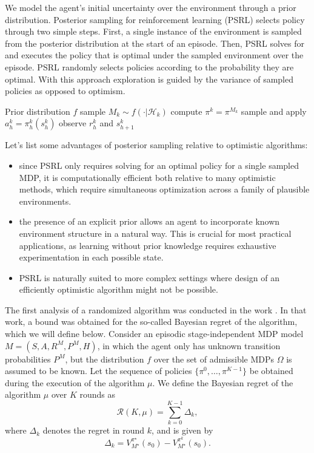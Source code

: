 \documentclass{article}
\numberwithin{equation}{section}
\newcommand{\cH}{\mathcal{H}}
\begin{document}
We model the agent's initial uncertainty over the environment
through a prior distribution. Posterior sampling for reinforcement
learning (PSRL) selects policy through two simple steps. First, a single instance of the
environment is sampled from the posterior distribution at the start of an episode. Then,
PSRL solves for and executes the policy that is optimal under the sampled environment over
the episode. PSRL randomly selects policies according to the probability they are optimal. With this approach exploration is guided by the variance of sampled policies as opposed to optimism.

 \begin{algorithm}
	\caption{Posterior Sampling for Reinforcement Learning (PSRL)}
	\begin{algorithmic}[1]
		\REQUIRE Prior distribution \(f\)
            \STATE sample \(M_k\sim f(\cdot|{\cH_{k}})\)
            \STATE compute \(\pi^k = \pi^{M_k}\)
                \STATE sample and apply \(a_h^k=\pi^k_h(s_h^k)\)
                \STATE observe \(r_h^k\) and \(s_{h+1}^k\)
            \ENDFOR
        \ENDFOR
	\end{algorithmic}	
\end{algorithm}

Let's list some advantages of posterior sampling relative to optimistic
algorithms:
\begin{itemize}
    \item since PSRL only requires solving for an optimal policy for a single sampled MDP, it is computationally efficient both relative to many optimistic methods, which
require simultaneous optimization across a family of plausible environments.
\item the presence of an explicit prior allows an agent to
incorporate known environment structure in a natural way. This is crucial for most practical applications, as learning without prior knowledge requires exhaustive experimentation
in each possible state.

\item PSRL is naturally suited to more complex settings
where design of an efficiently optimistic algorithm might not be possible{.}
\end{itemize}

     
The first analysis of a randomized algorithm was conducted in the work \cite{osband2013more}. In that work, a bound was obtained for the so-called Bayesian regret of the algorithm, which we will define below.
Consider an episodic stage-independent MDP model \( M = (S, A, R^M, P^M, H) \), in which the agent only has unknown transition probabilities \( P^M \), but the distribution \( f \) over the set of admissible MDPs \( \Omega \) is assumed to be known. Let the sequence of policies \( \{\pi^0, \ldots, \pi^{K-1}\} \) be obtained during the execution of the algorithm \( \mu \). We define the Bayesian regret of the algorithm \( \mu \) over \( K \) rounds as  
\[
\mathcal{R}(K, \mu) = \sum_{k=0}^{K-1} \Delta_k,
\]  
where \( \Delta_k \) denotes the regret in round \( k \), and is given by  
\[
\Delta_k = V^{\pi^{\star}}_{M^{\star}}(s_0) - {V^{\pi^k}_{M^\star}(s_0)}.
\]
\end{document}
